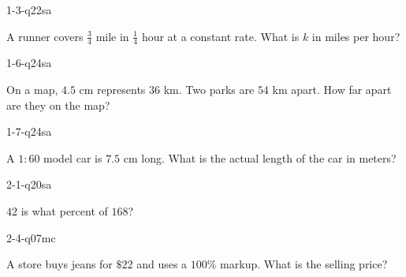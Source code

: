 
\begin{practiceQuestion}{1-3-q22}{sa}
\begin{questionText}
A runner covers $\frac{3}{4}$ mile in $\frac{1}{4}$ hour at a constant rate. What is $k$ in miles per hour?
\end{questionText}
\end{practiceQuestion}

\begin{practiceQuestion}{1-6-q24}{sa}
\begin{questionText}
On a map, $4.5$ cm represents $36$ km. Two parks are $54$ km apart. How far apart are they on the map?
\end{questionText}
\end{practiceQuestion}

\begin{practiceQuestion}{1-7-q24}{sa}
\begin{questionText}
A $1 : 60$ model car is $7.5$ cm long. What is the actual length of the car in meters?
\end{questionText}
\end{practiceQuestion}

\begin{practiceQuestion}{2-1-q20}{sa}
\begin{questionText}
$42$ is what percent of $168$?
\end{questionText}
\end{practiceQuestion}

\begin{practiceQuestion}{2-4-q07}{mc}
\begin{questionText}
A store buys jeans for $\$22$ and uses a $100\%$ markup. What is the selling price?
\end{questionText}
\end{practiceQuestion}

